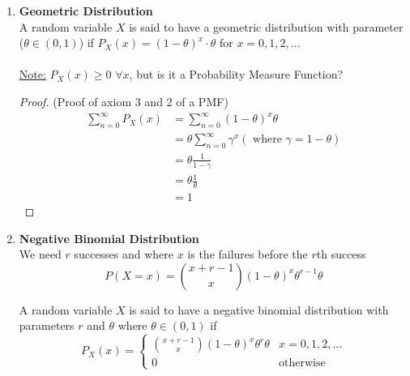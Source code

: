 \documentclass[12pt]{article}
\begin{document}
\begin{enumerate}
{\begin{proof}
	(Proof of (2.) in Note)\\
	\begin{align*}
		\sum_{x=0}^n P_X (x) &= \sum_{x=0}^n \binom{n}{x} \theta^x (1-\theta)^{n-x}\\
		&= (\theta + 1 - \theta)^n = 1^n = 1
	\end{align*}
	\underline{Recall that} $$(a+b)^n = \sum_{x=0}^n a^x b^{n-x}$$
\end{proof}
	
	}
	\item{
	\textbf{Geometric Distribution}\\
	A random variable $X$ is said to have a geometric distribution with parameter ($\theta \in (0,1)$) if $P_X (x) = (1 - \theta)^x \cdot \theta$ for $x = 0,1,2,...$\\
	\\
	\underline{Note:} $P_X (x) \geq 0$ $\forall x$, but is it a Probability Measure Function?\\
	\begin{proof}
	(Proof of axiom 3 and 2 of a PMF)\\
	\begin{align*}
		\sum_{n=0}^{\infty} P_X (x) &= \sum_{n=0}^{\infty} (1 - \theta)^x \theta\\
		&= \theta \sum_{n=0}^{\infty} \gamma^x (\text{ where } \gamma = 1 - \theta)\\
		&= \theta \frac{1}{1 - \gamma}\\
		&=\theta \frac{1}{\theta}\\
		&= 1
	\end{align*}
	\end{proof}
	}
	\item{
	\textbf{Negative Binomial Distribution}\\
	We need $r$ successes and where $x$ is the failures before the $r$th success
	$$P(X = x) = \binom{x+r - 1}{x} (1 - \theta)^x \theta^{r-1} \theta$$
	
	A random variable $X$ is said to have a negative binomial distribution with parameters $r$ and $\theta$ where $\theta \in (0,1)$ if\\
	$$P_X (x) = 
	\begin{cases}
		\binom{x+r - 1}{x} (1 - \theta)^x \theta^{r} \theta & x = 0,1,2,...\\
		0 & \text{otherwise}
	\end{cases}$$
	}
\end{enumerate}
\end{document}
